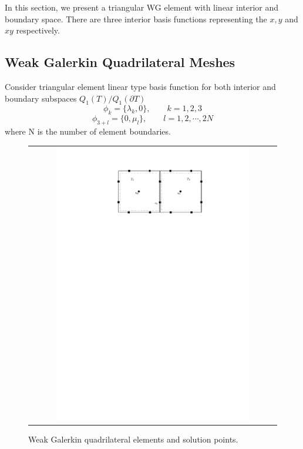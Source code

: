 In this section, we present a triangular WG element with linear interior and boundary space. There are three interior basis functions representing the $ x, y $ and $ xy $ respectively.

\subsection{Weak Galerkin Quadrilateral Meshes}

Consider triangular element linear type basis function for both interior and boundary subspaces $ Q_{1}(T) / Q_{1} (\partial T) $
\begin{equation}
\phi_{k} = \{ \lambda_{k}, 0 \}, \qquad k = 1,2, 3
\end{equation}
\begin{equation}
\phi_{3 + l} = \{ 0, \mu_{l} \}, \qquad l = 1, 2, \cdots , 2N
\end{equation}
where N is the number of element boundaries.
\begin{figure}[H]
	\centering
	\begin{tabular}{c}
		\includegraphics[width=0.8\textwidth]{./pics/quad.pdf}
	\end{tabular}
	\caption{\footnotesize Weak Galerkin quadrilateral elements and solution points.}\label{fig2: quad}
\end{figure}

